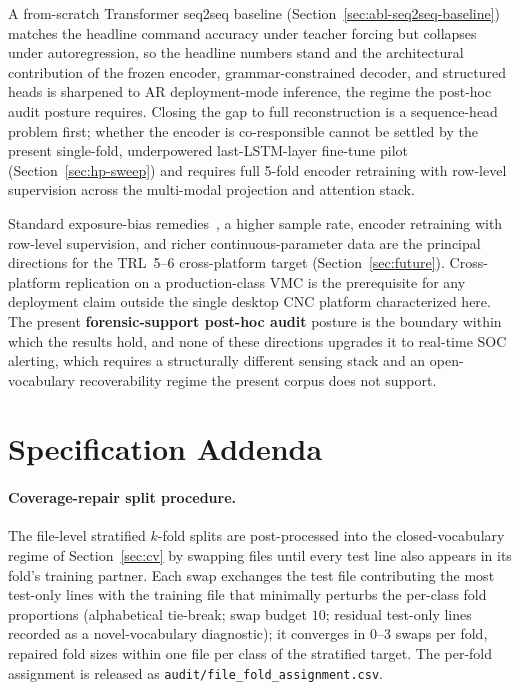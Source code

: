 \documentclass[sensors,article,submit,moreauthors,pdftex]{Definitions/mdpi}
\begin{document}
A from-scratch Transformer seq2seq baseline (Section~\ref{sec:abl-seq2seq-baseline}) matches the headline command accuracy under teacher forcing but collapses under autoregression, so the headline numbers stand and the architectural contribution of the frozen encoder, grammar-constrained decoder, and structured heads is sharpened to AR deployment-mode inference, the regime the post-hoc audit posture requires. Closing the gap to full reconstruction is a sequence-head problem first; whether the encoder is co-responsible cannot be settled by the present single-fold, underpowered last-LSTM-layer fine-tune pilot (Section~\ref{sec:hp-sweep}) and requires full 5-fold encoder retraining with row-level supervision across the multi-modal projection and attention stack.

Standard exposure-bias remedies~\cite{he2019exposure,ott2018uncertainty,ranzato2016sequence,holtzman2020curious,welleck2020neural}, a higher sample rate, encoder retraining with row-level supervision, and richer continuous-parameter data are the principal directions for the TRL~5--6 cross-platform target (Section~\ref{sec:future}). Cross-platform replication on a production-class VMC is the prerequisite for any deployment claim outside the single desktop CNC platform characterized here. The present \textbf{forensic-support post-hoc audit} posture is the boundary within which the results hold, and none of these directions upgrades it to real-time SOC alerting, which requires a structurally different sensing stack and an open-vocabulary recoverability regime the present corpus does not support.

\appendix
\section{Specification Addenda}
\label{app3:addenda}\label{app:spec-addenda}

\paragraph{Coverage-repair split procedure.} The file-level stratified $k$-fold splits are post-processed into the closed-vocabulary regime of Section~\ref{sec:cv} by swapping files until every test line also appears in its fold's training partner. Each swap exchanges the test file contributing the most test-only lines with the training file that minimally perturbs the per-class fold proportions (alphabetical tie-break; swap budget $10$; residual test-only lines recorded as a novel-vocabulary diagnostic); it converges in $0$--$3$ swaps per fold, repaired fold sizes within one file per class of the stratified target. The per-fold assignment is released as \texttt{audit/file\_fold\_assignment.csv}.
\end{document}
